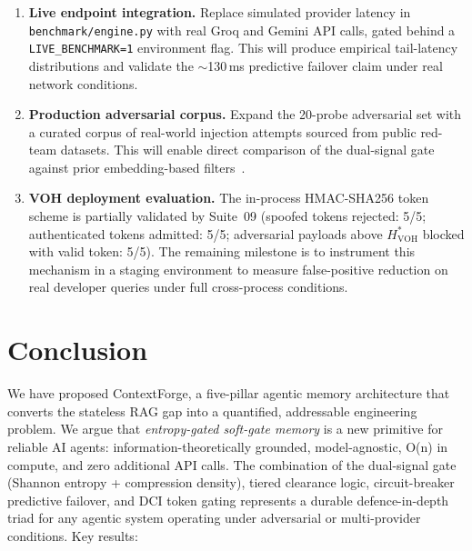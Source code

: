 \documentclass[11pt,twocolumn]{article}
\begin{document}
\begin{enumerate}[leftmargin=*, label=\textbf{P\arabic*.}]
  \item \textbf{Live endpoint integration.} Replace simulated provider
    latency in \texttt{benchmark/engine.py} with real Groq and Gemini
    API calls, gated behind a \texttt{LIVE\_BENCHMARK=1} environment
    flag. This will produce empirical tail-latency distributions and
    validate the $\sim$130\,ms predictive failover claim under real
    network conditions.

  \item \textbf{Production adversarial corpus.} Expand the 20-probe
    adversarial set with a curated corpus of real-world injection
    attempts sourced from public red-team datasets. This will enable
    direct comparison of the dual-signal gate against prior
    embedding-based filters~\cite{goodfellow2015,biggio2013}.

  \item \textbf{VOH deployment evaluation.} The in-process HMAC-SHA256
    token scheme is partially validated by Suite~09 (spoofed tokens
    rejected: 5/5; authenticated tokens admitted: 5/5; adversarial
    payloads above $H^{*}_\text{VOH}$ blocked with valid token: 5/5).
    The remaining milestone is to instrument this mechanism in a staging
    environment to measure false-positive reduction on real developer
    queries under full cross-process conditions.
\end{enumerate}

\section{Conclusion}
\label{sec:conclusion}

We have proposed ContextForge, a five-pillar agentic memory architecture
that converts the stateless RAG gap into a quantified, addressable
engineering problem. We argue that \emph{entropy-gated soft-gate memory}
is a new primitive for reliable AI agents: information-theoretically
grounded, model-agnostic, O(n) in compute, and zero additional API calls.
The combination of the dual-signal gate (Shannon entropy + compression
density), tiered clearance logic, circuit-breaker predictive failover,
and DCI token gating represents a durable defence-in-depth triad for
any agentic system operating under adversarial or multi-provider
conditions. Key results:
\end{document}
